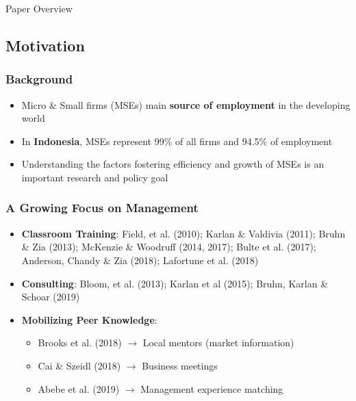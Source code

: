 \documentclass[hideothersubsections, usenames,dvipsnames,10pt]{beamer}
\begin{document}
\begin{frame}{Paper Overview}
\end{frame}


\subsection{Motivation}

\begin{frame}
\frametitle{Background}
	\begin{itemize}
	\item Micro \& Small firms (MSEs) main \textbf{source of employment} in the developing world
	\vspace{0.2in}
	\item In \textbf{Indonesia}, MSEs represent 99\% of all firms and 94.5\% of employment 
	\vspace{0.2in}
	\item Understanding the factors fostering efficiency and growth of MSEs is an important research and policy goal
	\end{itemize}
\end{frame}

\begin{frame}
\frametitle{A Growing Focus on Management}
\begin{itemize}
\item \textbf{Classroom Training}: Field, et al. (2010); Karlan \& Valdivia (2011); Bruhn \& Zia (2013); McKenzie \& Woodruff (2014, 2017); Bulte et al. (2017); Anderson, Chandy \& Zia (2018); Lafortune et al. (2018)
\vspace{0.2in}
\item \textbf{Consulting}: Bloom, et al. (2013); Karlan et al (2015); Bruhn, Karlan \& Schoar (2019)
\vspace{0.2in}

\item \textbf{Mobilizing Peer Knowledge}:
    \begin{itemize}
    \item Brooks et al. (2018) $\rightarrow$ Local mentors (market information)
    \item Cai \& Szeidl (2018) $\rightarrow$ Business meetings
    \item Abebe et al. (2019) $\rightarrow$ Management experience matching
    \end{itemize}
    \vspace{0.2in}
\end{itemize}
\end{frame}
\end{document}
